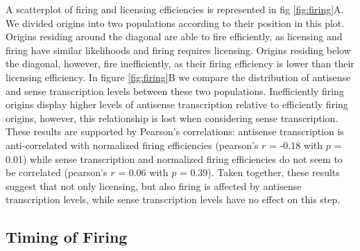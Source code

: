 A scatterplot of firing and licensing efficiencies is represented in fig \ref{fig:firing}A.
We divided origins into two populations according to their position in this plot.
Origins residing around the diagonal are able to fire efficiently, as licensing and firing have similar likelihoods and firing requires licensing. Origins residing below the diagonal, however, fire inefficiently, as their firing efficiency is lower than their licensing efficiency. 
In figure \ref{fig:firing}B we compare the distribution of antisense and sense transcription levels between these two populations. Inefficiently firing origins display higher levels of antisense transcription relative to efficiently firing origins, however, this relationship is lost when considering sense transcription. 
These results are supported by Pearson’s correlations: antisense transcription is anti-correlated with normalized firing efficiencies (pearson’s $r$ = -0.18 with $p$ = 0.01) while sense transcription and normalized firing efficiencies do not seem to be correlated (pearson’s $r$ = 0.06 with $p$ = 0.39). 
Taken together, these results suggest that not only licensing, but also firing is affected by antisense transcription levels, while sense transcription levels have no effect on this step.


\subsection{Timing of Firing}

